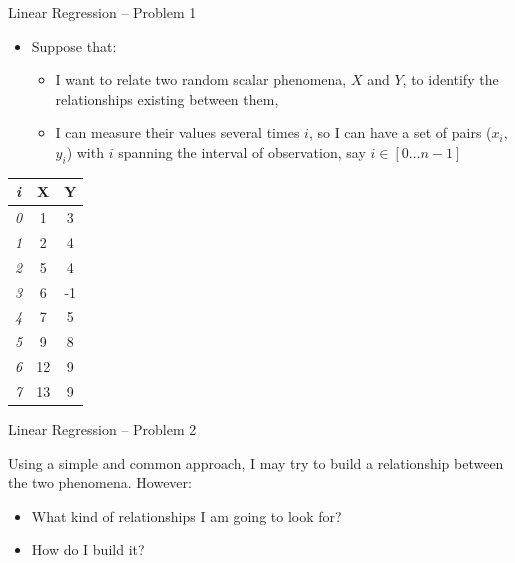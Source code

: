 \documentclass{beamer}
\begin{document}
\begin{frame}
{\centerline{Linear Regression -- Problem 1}}

\begin{itemize}
\item Suppose that:
\begin{itemize}
\item  I want to relate two random scalar phenomena, $X$ and $Y$, to identify the relationships existing between them,
\item I can measure their values several times $i$, so I can have a set of pairs ($x_i$,$y_i$) with $i$ spanning the interval of observation, say $i \in [0 \ldots{} n-1]$
\end{itemize}
\end{itemize}

  \begin{center}
  \small
    \begin{tabular}{|c|c|c|}      
\toprule
     \textit{i} & \textbf{X} & \textbf{Y} \\
    \midrule  \textit{0} &1 & 3 \\
    \midrule  \textit{1} &2 & 4 \\
    \midrule  \textit{2} &5 & 4 \\
    \midrule  \textit{3} &6 & -1 \\
    \midrule  \textit{4} &7 & 5 \\
    \midrule  \textit{5} &9 & 8 \\
    \midrule  \textit{6} &12 & 9 \\
    \midrule  \textit{7} &13 & 9 \\
    \bottomrule
    \end{tabular}
  \end{center}
\end{frame}

\begin{frame}
{\centerline{Linear Regression -- Problem 2}}
Using a simple and common approach, I may try to build a relationship between the two phenomena.
However:
\begin{itemize}
\item  What kind of relationships I am going to look for?
\item How do I build it?
\end{itemize}

\end{frame}
\end{document}
